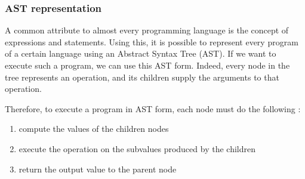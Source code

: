 \documentclass[twoside,11pt,a4paper]{article}
\newcommand{\java}[1]{\textsf{#1}}
\begin{document}


\subsubsection{AST representation}


A common attribute to almost every programming language is the concept of expressions and statements. Using this, it is possible to represent every program of a certain language using an Abstract Syntax Tree (AST). If we want to execute such a program, we can use this AST form. Indeed, every node in the tree represents an operation, and its children supply the arguments to that operation.

Therefore, to execute a program in AST form, each node must do the following :
\begin{enumerate}
\item compute the values of the children nodes
\item execute the operation on the subvalues produced by the children
\item return the output value to the parent node
\end{enumerate}

\end{document}
